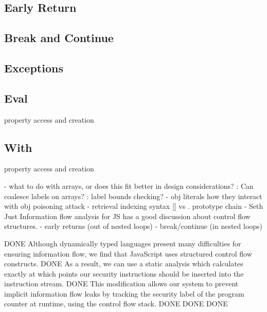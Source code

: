 \subsection{Early Return}
\subsection{Break and Continue}
\subsection{Exceptions}
\subsection{Eval}
property access and creation

\subsection{With}
property access and creation


 - what to do with arrays, or does this fit better in design considerations?
   : Can coalesce labels on arrays?
   : label bounds checking? 
 - obj literals
   how they interact with obj poisoning attack
 - retrieval
   indexing syntax [] vs .
   prototype chain
 - Seth Just Information flow analysis for JS has a good discussion about control flow structures.
 - early returns (out of nested loops)
 - break/continue (in nested loops)


DONE Although dynamically typed languages present many difficulties for ensuring information flow, we find that JavaScript uses structured control flow constructs.
DONE As a result, we can use a static analysis which calculates exactly at which points our security instructions should be inserted into the instruction stream.
DONE This modification allows our system to prevent implicit information flow leaks by tracking the security label of the program counter at runtime, using the control flow stack.
DONE %
DONE %
DONE %

